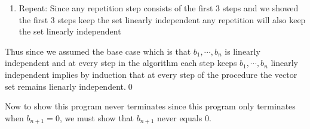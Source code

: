 \documentclass[12pt]{amsart}
\begin{document}
\begin{problem}
\begin{subproblem}
\begin{enumerate}
        \item Repeat: Since any repetition step consists of the first 3 steps and we showed the first 3 steps keep the set linearly independent any repetition will also keep the set linearly independent
      \end{enumerate}
        Thus since we assumed the base case which is that $b_1,\cdots,b_n$ is linearly independent and at every step in the algorithm each step keeps $b_1,\cdots,b_n$ linearly independent implies by induction that at every step of the procedure the vector set remains lienarly independent.\qed
    \end{subproblem}
    \begin{subproblem}
      Now to show this program never terminates since this program only terminates when $b_{n+1}=0$, we must show that $b_{n+1}$ never equals $0$. 


\end{subproblem}
\end{problem}
\end{document}
